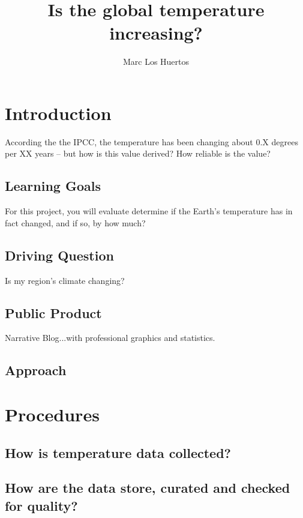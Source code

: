 \documentclass{article}\usepackage[]{graphicx}\usepackage[]{color}
\title{Is the global temperature increasing?}
\author{Marc Los Huertos}
\date{}
\begin{document}
\maketitle

\section{Introduction}

According the the IPCC, the temperature has been changing about 0.X degrees per XX years -- but how is this value derived? How reliable is the value?  

\subsection{Learning Goals}

For this project, you will evaluate determine if the Earth's temperature has in fact changed, and if so, by how much?

\subsection{Driving Question}

Is my region's climate changing?

\subsection{Public Product}

Narrative Blog...with professional graphics and statistics.

\subsection{Approach}


\section{Procedures}

\subsection{How is temperature data collected?}

\subsection{How are the data store, curated and checked for quality?}
\end{document}
